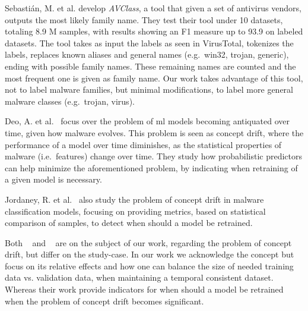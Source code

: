 Sebastián, M. et al.\cite{sebastian2016avclass} develop \textit{AVClass}, a tool that given a set of antivirus vendors, outputs the most likely family name. They test their tool under 10 datasets, totaling 8.9 M samples, with results showing an F1 measure up to 93.9 on labeled datasets. The tool takes as input the labels as seen in VirusTotal, tokenizes the labels, replaces known aliases and general names (e.g.\ win32, trojan, generic), ending with possible family names. These remaining names are counted and the most frequent one is given as family name. Our work takes advantage of this tool, not to label malware families, but minimal modifications, to label more general malware classes (e.g.\ trojan, virus).

Deo, A. et al.~\cite{deo2016prescience} focus over the problem of \gls{ml} models becoming antiquated over time, given how malware evolves. This problem is seen as concept drift, where the performance of a model over time diminishes, as the statistical properties of malware (i.e.\ features) change over time. They study how probabilistic predictors can help minimize the aforementioned problem, by indicating when retraining of a given model is necessary. 

Jordaney, R. et al.~\cite{jordaney2017transcend} also study the problem of concept drift in malware classification models, focusing on providing metrics, based on statistical comparison of samples, to detect when should a model be retrained. 

Both ~\cite{deo2016prescience} and ~\cite{jordaney2017transcend} are on the subject of our work, regarding the problem of concept drift, but differ on the study-case. In our work we acknowledge the concept but focus on its relative effects and how one can balance the size of needed training data vs. validation data, when maintaining a temporal consistent dataset. Whereas their work provide indicators for when should a model be retrained when the problem of concept drift becomes significant.